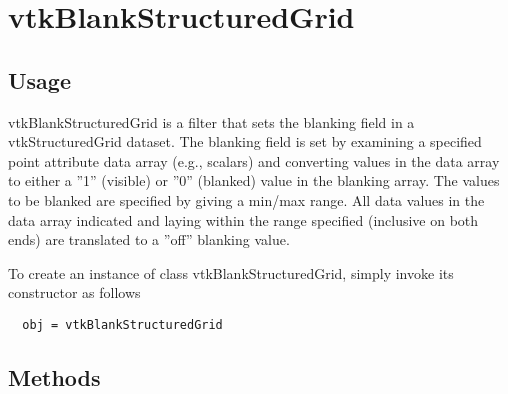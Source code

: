 \section{vtkBlankStructuredGrid}

\subsection{Usage}

 vtkBlankStructuredGrid is a filter that sets the blanking field in a 
 vtkStructuredGrid dataset. The blanking field is set by examining a
 specified point attribute data array (e.g., scalars) and converting
 values in the data array to either a ''1'' (visible) or ''0'' (blanked) value
 in the blanking array. The values to be blanked are specified by giving
 a min/max range. All data values in the data array indicated and laying
 within the range specified (inclusive on both ends) are translated to 
 a ''off'' blanking value.

To create an instance of class vtkBlankStructuredGrid, simply
invoke its constructor as follows
\begin{verbatim}
  obj = vtkBlankStructuredGrid
\end{verbatim}
\subsection{Methods}


